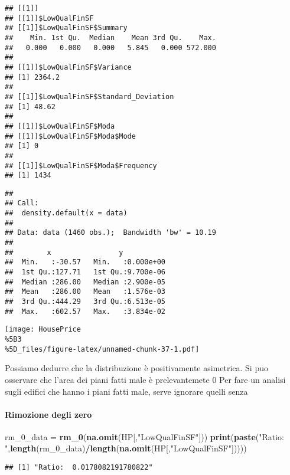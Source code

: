 \documentclass[
]{article}
\newenvironment{Shaded}{\begin{snugshade}}{\end{snugshade}}
\newcommand{\FunctionTok}[1]{\textcolor[rgb]{0.13,0.29,0.53}{\textbf{#1}}}
\newcommand{\NormalTok}[1]{#1}
\newcommand{\OtherTok}[1]{\textcolor[rgb]{0.56,0.35,0.01}{#1}}
\newcommand{\SpecialCharTok}[1]{\textcolor[rgb]{0.81,0.36,0.00}{\textbf{#1}}}
\newcommand{\StringTok}[1]{\textcolor[rgb]{0.31,0.60,0.02}{#1}}
\begin{document}
\begin{verbatim}
## [[1]]
## [[1]]$LowQualFinSF
## [[1]]$LowQualFinSF$Summary
##    Min. 1st Qu.  Median    Mean 3rd Qu.    Max. 
##   0.000   0.000   0.000   5.845   0.000 572.000 
## 
## [[1]]$LowQualFinSF$Variance
## [1] 2364.2
## 
## [[1]]$LowQualFinSF$Standard_Deviation
## [1] 48.62
## 
## [[1]]$LowQualFinSF$Moda
## [[1]]$LowQualFinSF$Moda$Mode
## [1] 0
## 
## [[1]]$LowQualFinSF$Moda$Frequency
## [1] 1434
\end{verbatim}

\begin{verbatim}
## 
## Call:
##  density.default(x = data)
## 
## Data: data (1460 obs.);  Bandwidth 'bw' = 10.19
## 
##        x                y            
##  Min.   :-30.57   Min.   :0.000e+00  
##  1st Qu.:127.71   1st Qu.:9.700e-06  
##  Median :286.00   Median :2.900e-05  
##  Mean   :286.00   Mean   :1.576e-03  
##  3rd Qu.:444.29   3rd Qu.:6.513e-05  
##  Max.   :602.57   Max.   :3.834e-02
\end{verbatim}

\texttt{[image: HousePrice\\\%5B3\\\%5D\_files/figure-latex/unnamed-chunk-37-1.pdf]}

Possiamo dedurre che la distribuzione è positivamente asimetrica. Si puo
osservare che l'area dei piani fatti male è prelevantemete 0 Per fare un
analisi sugli edifici che hanno i piani fatti male, serve ignorare
quelli senza

\paragraph{Rimozione degli zero}\label{rimozione-degli-zero-7}

\begin{Shaded}
\begin{Highlighting}[]
\NormalTok{rm\_0\_data }\OtherTok{=} \FunctionTok{rm\_0}\NormalTok{(}\FunctionTok{na.omit}\NormalTok{(HP[,}\StringTok{"LowQualFinSF"}\NormalTok{]))}
\FunctionTok{print}\NormalTok{(}\FunctionTok{paste}\NormalTok{(}\StringTok{"Ratio: "}\NormalTok{,}\FunctionTok{length}\NormalTok{(rm\_0\_data)}\SpecialCharTok{/}\FunctionTok{length}\NormalTok{(}\FunctionTok{na.omit}\NormalTok{(HP[,}\StringTok{"LowQualFinSF"}\NormalTok{]))))}
\end{Highlighting}
\end{Shaded}

\begin{verbatim}
## [1] "Ratio:  0.0178082191780822"
\end{verbatim}
\end{document}

